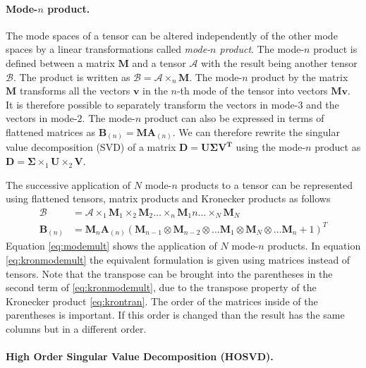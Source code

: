 \documentclass[11pt,a4paper]{report}
\begin{document}
\paragraph{Mode-$n$ product.}
The mode spaces of
a tensor can be altered independently of the other
mode spaces by a linear transformations called \textit{mode-$n$ product}. The
mode-$n$ product is defined between a matrix $\mathbf{M}$ and a tensor
$\mathcal{A}$ with the result being another tensor $\mathcal{B}$. The product is
written as $\mathcal{B} = \mathcal{A} \times_n \mathbf{M}$. The mode-$n$ product
by the matrix $\mathbf{M}$ transforms all the vectors $\mathbf{v}$ in the $n$-th mode of the tensor into vectors
$\mathbf{M}\mathbf{v}$. It is therefore possible to separately transform the vectors in
mode-$3$ and the vectors in mode-$2$. The mode-$n$ product can also be expressed in
terms of flattened matrices as $\mathbf{B}_{(n)} = \mathbf{M} \mathbf{A}_{(n)}
$. We can therefore rewrite the singular value decomposition (SVD) of a matrix $\mathbf{D
  = U\Sigma V^T}$ using the mode-$n$ product as $\mathbf{D} = \mathbf{\Sigma} \times_1
\mathbf{U} \times_2 \mathbf{V}$. 

The successive application of $N$ mode-$n$ products to a tensor can be
represented using flattened tensors, matrix products and Kronecker products as follows
\begin{align}\label{eq:modemult}
\mathcal{B} &= \mathcal{A} \times_1 \mathbf{M}_1 \times_2 \mathbf{M}_2  \ldots
\times_n \mathbf{M}_1n \ldots \times_N \mathbf{M}_N\\
\label{eq:kronmodemult}
\mathbf{B}_{(n)} &= \mathbf{M}_n \mathbf{A}_{(n)} (\mathbf{M}_{n-1} \otimes
\mathbf{M}_{n-2} \otimes \ldots \mathbf{M}_1 \otimes \mathbf{M}_N \otimes \ldots \mathbf{M}_n+1)^T 
\end{align}
Equation \ref{eq:modemult} shows the application of $N$ mode-$n$
products. In equation \ref{eq:kronmodemult} the equivalent formulation is given
using matrices instead of tensors. Note that the transpose can be brought into
the parentheses in the second term of
\ref{eq:kronmodemult}, due to the transpose property of
the Kronecker product \ref{eq:krontran}. The order of the matrices inside of the
parentheses is important. If this order is changed than the result has the
same columns but in a different order.
\paragraph{High Order Singular Value Decomposition (HOSVD).}
\end{document}
